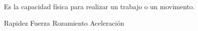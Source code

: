 
\question Es la capacidad física para realizar un trabajo o un movimento.

  \begin{oneparchoices}
    \choice Rapidez
    \CorrectChoice Fuerza
    \choice Rozamiento
    \choice Aceleración
  \end{oneparchoices}
  \answerline[B]
